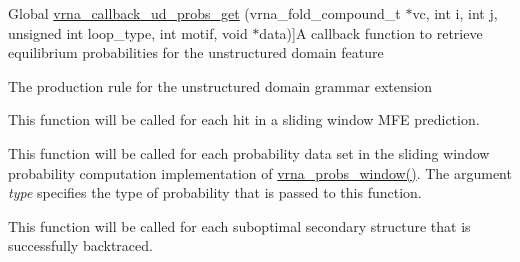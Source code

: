 \begin{DoxyRefList}
%
Global \hyperlink{group__domains__up_gaa10ba1b6f1e179ea84c5caca9cdaae67}{vrna\+\_\+callback\+\_\+ud\+\_\+probs\+\_\+get} (vrna\+\_\+fold\+\_\+compound\+\_\+t $\ast$vc, int i, int j, unsigned int loop\+\_\+type, int motif, void $\ast$data)]A callback function to retrieve equilibrium probabilities for the unstructured domain feature  
\item[\label{callbacks__callbacks000012}%
\Hypertarget{callbacks__callbacks000012}%
Global \hyperlink{group__domains__up_ga4fdfc02c1b660c07f2d887772f02a0a1}{vrna\+\_\+callback\+\_\+ud\+\_\+production} (vrna\+\_\+fold\+\_\+compound\+\_\+t $\ast$vc, void $\ast$data)]The production rule for the unstructured domain grammar extension  
\item[\label{callbacks__callbacks000008}%
\Hypertarget{callbacks__callbacks000008}%
Global \hyperlink{group__mfe__fold_ga4f3e5bc214ef803074ace313cb9571b4}{vrna\+\_\+mfe\+\_\+window\+\_\+callback} (int start, int end, const char $\ast$structure, float en, void $\ast$data)]This function will be called for each hit in a sliding window M\+FE prediction.  
\item[\label{callbacks__callbacks000007}%
\Hypertarget{callbacks__callbacks000007}%
Global \hyperlink{LPfold_8h_abe710a1182e6db69cc75329dfc9bed67}{vrna\+\_\+probs\+\_\+window\+\_\+callback} (F\+L\+T\+\_\+\+O\+R\+\_\+\+D\+BL $\ast$pr, int pr\+\_\+size, int i, int max, unsigned int type, void $\ast$data)]This function will be called for each probability data set in the sliding window probability computation implementation of \hyperlink{group__local__pf__fold_ga70ec33810fa17a9f67a7c59f156d0137}{vrna\+\_\+probs\+\_\+window()}. The argument {\itshape type} specifies the type of probability that is passed to this function.  
\item[\label{callbacks__callbacks000009}%
\Hypertarget{callbacks__callbacks000009}%
Global \hyperlink{group__subopt__wuchty_gaa0270c66d04f59e750401695b8282e04}{vrna\+\_\+subopt\+\_\+callback} (const char $\ast$stucture, float energy, void $\ast$data)]This function will be called for each suboptimal secondary structure that is successfully backtraced. 
\end{DoxyRefList}